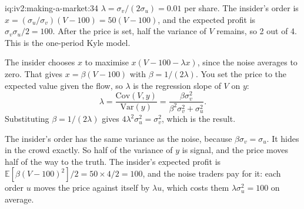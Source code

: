\begin{solution}{iq:iv2:making-a-market:34}
$\lambda = \sigma_v/(2\sigma_u) = 0.01$ per share. The insider's order is $x = (\sigma_u/\sigma_v)(V - 100) = 50(V - 100)$, and the expected profit is $\sigma_v\sigma_u/2 = 100$. After the price is set, half the variance of $V$ remains, so 2 out of 4. This is the one-period Kyle model.

The insider chooses $x$ to maximise $x(V - 100 - \lambda x)$, since the noise averages to zero. That gives $x = \beta(V - 100)$ with $\beta = 1/(2\lambda)$. You set the price to the expected value given the flow, so $\lambda$ is the regression slope of $V$ on $y$:
\[
\lambda = \frac{\mathrm{Cov}(V, y)}{\mathrm{Var}(y)} = \frac{\beta \sigma_v^2}{\beta^2 \sigma_v^2 + \sigma_u^2}.
\]
Substituting $\beta = 1/(2\lambda)$ gives $4\lambda^2\sigma_u^2 = \sigma_v^2$, which is the result.

The insider's order has the same variance as the noise, because $\beta\sigma_v = \sigma_u$. It hides in the crowd exactly. So half of the variance of $y$ is signal, and the price moves half of the way to the truth. The insider's expected profit is $\mathbb{E}\left[\beta (V-100)^2\right]/2 = 50 \times 4/2 = 100$, and the noise traders pay for it: each order $u$ moves the price against itself by $\lambda u$, which costs them $\lambda\sigma_u^2 = 100$ on average.

\end{solution}

